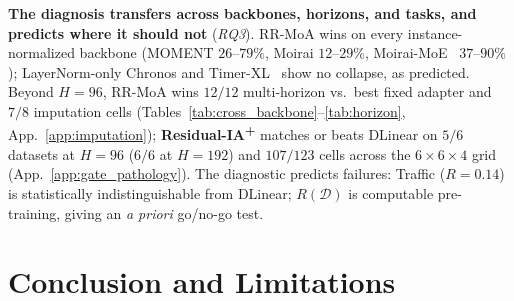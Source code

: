 \documentclass{article}
\begin{document}
{ \textbf{The diagnosis transfers across backbones, horizons, and tasks, and predicts where it should not} (\emph{RQ3}).\label{sec:cross_backbone} RR-MoA wins on every instance-normalized backbone (MOMENT $26$--$79\%$, Moirai $12$--$29\%$, Moirai-MoE~\citep{liu2025moiraimoe} $37$--$90\%$); LayerNorm-only Chronos and Timer-XL~\citep{liu2025timerxl} show no collapse, as predicted. Beyond $H{=}96$, RR-MoA wins $12/12$ multi-horizon vs.\ best fixed adapter and $7/8$ imputation cells (Tables~\ref{tab:cross_backbone}--\ref{tab:horizon}, App.~\ref{app:imputation}); \textbf{Residual-IA\textsuperscript{+}} matches or beats DLinear on $5/6$ datasets at $H{=}96$ ($6/6$ at $H{=}192$) and $107/123$ cells across the $6{\times}6{\times}4$ grid (App.~\ref{app:gate_pathology}). The diagnostic predicts failures: Traffic ($R{=}0.14$) is statistically indistinguishable from DLinear; $R(\mathcal{D})$ is computable pre-training, giving an \emph{a priori} go/no-go test.}

\section{Conclusion and Limitations}
\end{document}
